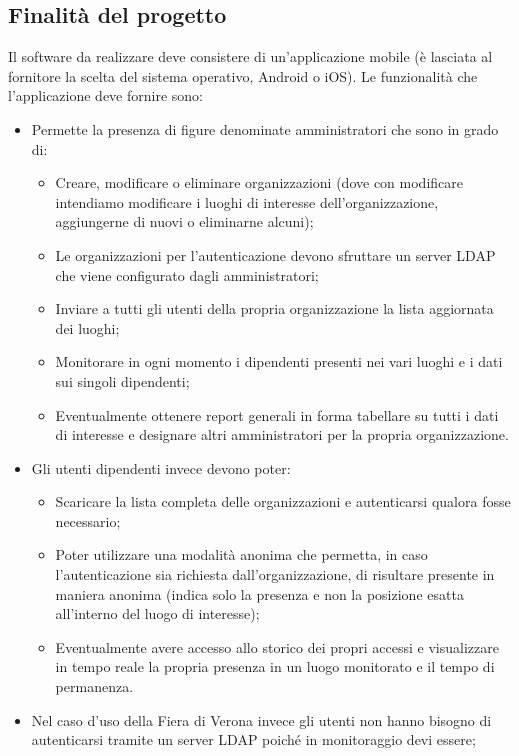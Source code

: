 \documentclass[../studio-di-fattibilita.tex]{subfiles}
\begin{document}
	\subsection{Finalità del progetto}
	\label{subsec:finalità_del_progetto}
	Il software da realizzare deve consistere di un'applicazione mobile (è lasciata al fornitore la scelta del sistema operativo, Android o iOS). Le funzionalità che l'applicazione deve fornire sono:
	\begin{itemize}
		\item Permette la presenza di figure denominate amministratori che sono in grado di:
		\begin{itemize}
		    \item Creare, modificare o eliminare organizzazioni (dove con modificare intendiamo modificare i luoghi di interesse dell’organizzazione, aggiungerne di nuovi o eliminarne alcuni);
		    \item Le organizzazioni per l’autenticazione devono sfruttare un server LDAP che viene configurato dagli amministratori;
		    \item Inviare a tutti gli utenti della propria organizzazione la lista aggiornata dei luoghi;
		    \item Monitorare in ogni momento i dipendenti presenti nei vari luoghi e i dati sui singoli dipendenti;
		    \item Eventualmente ottenere report generali in forma tabellare su tutti i dati di interesse e designare altri amministratori per la propria organizzazione.
		\end{itemize}
		\item Gli utenti dipendenti invece devono poter:
		\begin{itemize}
		    \item Scaricare la lista completa delle organizzazioni e autenticarsi qualora fosse necessario;
		    \item Poter utilizzare una modalità anonima che permetta, in caso l’autenticazione sia richiesta dall’organizzazione, di risultare presente in maniera anonima (indica solo la presenza e non la posizione esatta all’interno del luogo di interesse);
		    \item Eventualmente avere accesso allo storico dei propri accessi e visualizzare in tempo reale la propria presenza in un luogo monitorato e il tempo di permanenza.
		\end{itemize}
		\item Nel caso d’uso della Fiera di Verona invece gli utenti non hanno bisogno di autenticarsi tramite un server LDAP poiché in monitoraggio devi essere;

\end{itemize}
\end{document}

